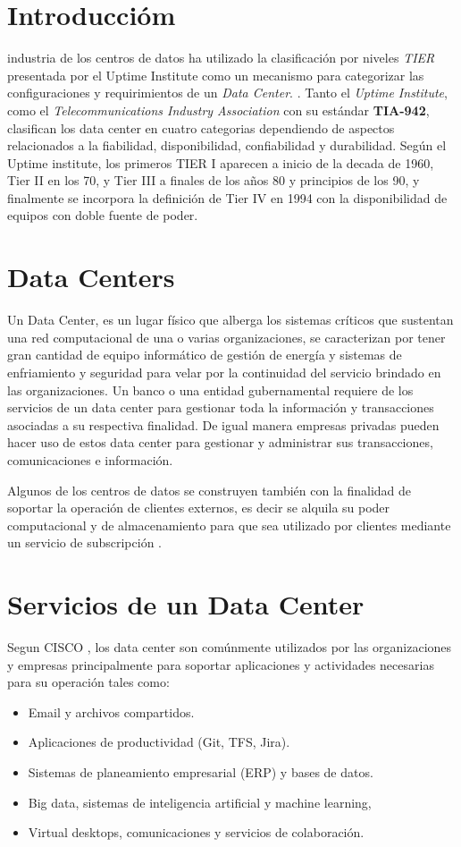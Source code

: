 \documentclass[journal]{IEEEtran}
\begin{document}
\section{Introduccióm}
 industria de los centros de datos ha utilizado la clasificación por niveles \emph{TIER} presentada
por el Uptime Institute como un mecanismo para categorizar las configuraciones y 
requirimientos de un \emph{Data Center}. \cite{arno_friedl_gross_schuerger_2012,pitt_turner}.
Tanto el \emph{Uptime Institute}, como el \emph{Telecommunications Industry Association} con su estándar \textbf{TIA-942}\cite{TIA}, clasifican los 
data center en cuatro categorias dependiendo de aspectos relacionados a la fiabilidad, disponibilidad, confiabilidad y durabilidad.
Según el Uptime institute, los primeros TIER I aparecen a inicio de la decada de 1960, Tier II en los 70, y Tier III a finales de los años 80 y principios de los 90, y finalmente
se incorpora la definición de Tier IV en 1994 con la disponibilidad de equipos con doble fuente de poder.

\section{Data Centers}
Un Data Center, es un lugar físico que alberga los sistemas críticos que sustentan una red computacional de una o varias organizaciones, se caracterizan por tener gran cantidad de equipo informático 
de gestión de energía y sistemas de enfriamiento y seguridad para velar por la continuidad del servicio brindado en las organizaciones.
Un banco o una entidad gubernamental requiere de los servicios de un data center para gestionar toda la información y transacciones asociadas a su respectiva finalidad. De igual manera empresas privadas pueden hacer
uso de estos data center para gestionar y administrar sus transacciones, comunicaciones e información.

Algunos de los centros de datos se construyen también con la finalidad de soportar la operación de clientes externos, es decir se alquila su poder computacional y de almacenamiento para que sea utilizado por
clientes mediante un servicio de subscripción \cite{amazon_2003}.

\section{Servicios de un Data Center}
Segun CISCO \cite{cisco_2020}, los data center son comúnmente utilizados por las organizaciones y empresas principalmente para soportar aplicaciones y actividades necesarias para su operación tales
como:
\begin{itemize}
  \item Email y archivos compartidos.
  \item Aplicaciones de productividad (Git, TFS, Jira).
  \item Sistemas de planeamiento empresarial (ERP) y bases de datos.
  \item Big data, sistemas de inteligencia artificial y machine learning,
  \item Virtual desktops, comunicaciones y servicios de colaboración.
\end{itemize}
\end{document}
